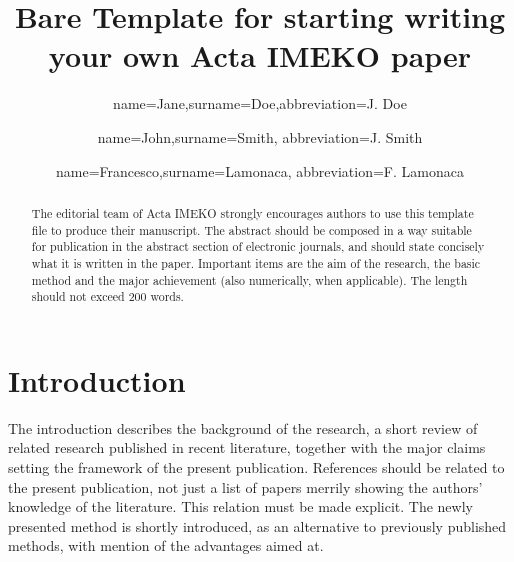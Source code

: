 \documentclass[article]{imeko_acta}
\begin{document}
\title{Bare Template for starting writing your own Acta IMEKO paper} %

\author[1]{name=Jane,surname=Doe,abbreviation=J. Doe}
\author[2]{name=John,surname=Smith, abbreviation=J. Smith}
\author[3,4]{name=Francesco,surname=Lamonaca, abbreviation=F. Lamonaca}






\begin{abstract}
The editorial team of Acta IMEKO strongly encourages 
authors to use this \LaTeXe template file to produce their manuscript. 
The abstract should be composed in a way suitable for publication 
in the abstract section of electronic journals, 
and should state concisely what it is written in the paper. 
Important items are the aim of the research, the basic method and the major achievement 
(also numerically, when applicable). The length should not exceed 200 words.
\end{abstract}

\maketitle %

\section{Introduction}

The introduction describes the background of the research, a 
short review of related research published in recent literature, 
together with the major claims setting the framework of the 
present publication. References should be related to the present 
publication, not just a list of papers merrily showing the authors'
knowledge of the literature. This relation must be made explicit. 
The newly presented method is shortly introduced, as an 
alternative to previously published methods, with mention of the 
advantages aimed at.
\end{document}
